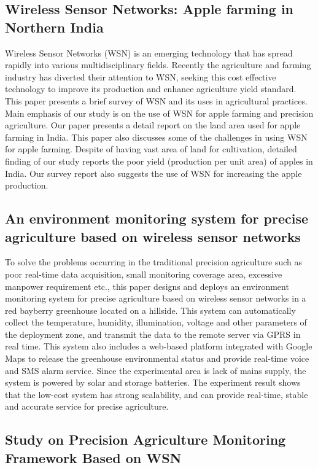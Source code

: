 \documentclass[10pt,a4paper]{article}
\begin{document}
\subsection{Wireless Sensor Networks: Apple farming in Northern India}

\quad
Wireless Sensor Networks (WSN) is an emerging technology that has spread rapidly into various multidisciplinary fields. Recently the agriculture and farming industry has diverted their attention to WSN, seeking this cost effective technology to improve its production and enhance agriculture yield standard. This paper presents a brief survey of WSN and its uses in agricultural practices. Main emphasis of our study is on the use of WSN for apple farming and precision agriculture. Our paper presents a detail report on the land area used for apple farming in India. This paper also discusses some of the challenges in using WSN for apple farming. Despite of having vast area of land for cultivation, detailed finding of our study reports the poor yield (production per unit area) of apples in India. Our survey report also suggests the use of WSN for increasing the apple production. \cite{4}

\subsection{An environment monitoring system for precise agriculture based on wireless sensor networks}

\quad
To solve the problems occurring in the traditional precision agriculture such as poor real-time data acquisition, small monitoring coverage area, excessive manpower requirement etc., this paper designs and deploys an environment monitoring system for precise agriculture based on wireless sensor networks in a red bayberry greenhouse located on a hillside. This system can automatically collect the temperature, humidity, illumination, voltage and other parameters of the deployment zone, and transmit the data to the remote server via GPRS in real time. This system also includes a web-based platform integrated with Google Maps to release the greenhouse environmental status and provide real-time voice and SMS alarm service. Since the experimental area is lack of mains supply, the system is powered by solar and storage batteries. The experiment result shows that the low-cost system has strong scalability, and can provide real-time, stable and accurate service for precise agriculture. \cite{5}
 
\subsection{Study on Precision Agriculture Monitoring Framework Based on WSN}
\end{document}
